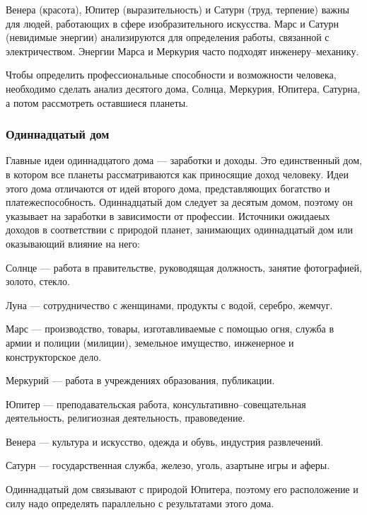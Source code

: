 Венера (красота), Юпитер (выразительность) и Сатурн (труд, терпение) важны для людей, работающих в сфере изобразительного искусства. Марс и Сатурн (невидимые энергии) анализируются для определения работы, связанной с электричеством. Энергии Марса и Меркурия часто подходят инженеру--механику.

Чтобы определить профессиональные способности и возможности человека, необходимо сделать анализ десятого дома, Солнца, Меркурия, Юпитера, Сатурна, а потом рассмотреть оставшиеся планеты.

\subsubsection*{Одиннадцатый дом}

Главные идеи одиннадцатого дома --- заработки и доходы. Это единственный дом, в котором все планеты рассматриваются как приносящие доход человеку. Идеи этого дома отличаются от идей второго дома, представляющих богатство и платежеспособность. Одиннадцатый дом следует за десятым домом, поэтому он указывает на заработки в зависимости от профессии. Источники ожидаеых доходов в соответствии с природой планет, занимающих одиннадцатый дом или оказывающий влияние на него:

\begin{myenum}
	\item Солнце --- работа в правительстве, руководящая должность, занятие фотографией, золото, стекло.
	\item Луна --- сотрудничество с женщинами, продукты с водой, серебро, жемчуг.
	\item Марс --- производство, товары, изготавливаемые с помощью огня, служба в армии и полиции (милиции), земельное имущество, инженерное и конструкторское дело.
	\item Меркурий --- работа в учреждениях образования, публикации.
	\item Юпитер --- преподавательская работа, консультативно--совещательная деятельность, религиозная деятельность, правоведение.
	\item Венера --- культура и искусство, одежда и обувь, индустрия развлечений.
	\item Сатурн --- государственная служба, железо, уголь, азартыне игры и аферы.
\end{myenum}

Одиннадцатый дом связывают с природой Юпитера, поэтому его расположение и силу надо определять параллельно с результатами этого дома.

